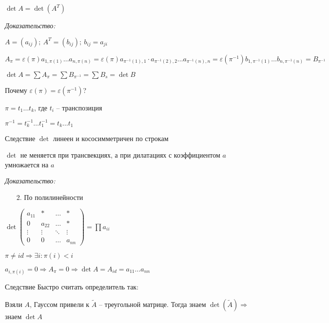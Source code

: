 \documentclass[12pt]{article}
\begin{document}
\begin{theo}{}
    $\det A = \det(A^T)$
\end{theo}

\textit{Доказательство:}

$A = (a_{ij});\ A^T = (b_{ij});\ b_{ij} = a_{ji}$

$A_\pi = \varepsilon(\pi) a_{1, \pi(1)} \ldots a_{n, \pi(n)} = \varepsilon(\pi) a_{\pi^{-1}(1), 1} \cdot a_{\pi^{-1}(2), 2} \ldots a_{\pi^{-1}(n), n} = \varepsilon(\pi^{-1}) b_{1, \pi^{-1}(1)} \ldots b_{n, \pi^{-1}(n)} = B_{\pi^{-1}}$

$\det A = \sum A_\pi = \sum B_{\pi^{-1}} = \sum B_s = \det B$

Почему $\varepsilon(\pi) = \varepsilon(\pi^{-1})$?

$\pi = t_1 \ldots t_k$, где $t_i$ -- транспозиция

$\pi^{-1} = t_k^{-1} \ldots t_1^{-1} = t_k \ldots t_1$

\begin{theo}{Следствие}
    $\det$ линеен и кососимметричен по строкам
\end{theo}

\begin{theo}{}
    $\det$ не меняется при трансвекциях, а при дилатациях с коэффициентом $a$ умножается на $a$
\end{theo}

\textit{Доказательство:}

\begin{enumerate}
    \item[2.] По полилинейности
\end{enumerate}

\begin{lem}{}
    $\det \begin{pmatrix}
        a_{11} & * & \ldots & * \\
        0 & a_{22} & \ldots & * \\
        \vdots & \vdots & \ddots & \vdots \\
        0 & 0 & \ldots & a_{nn}
    \end{pmatrix} = \prod a_{ii}$
\end{lem}

$\pi \neq id \Rightarrow \exists i : \pi(i) < i$

$a_{i, \pi(i)} = 0 \Rightarrow A_\pi = 0 \Rightarrow \det A = A_{id} = a_{11} \ldots a_{nn}$

\begin{theo}{Следствие}
    Быстро считать определитель так:

    Взяли $A$, Гауссом привели к $\tilde{A}$ -- треугольной матрице. Тогда знаем $\det(\tilde{A}) \Rightarrow$ знаем $\det A$
\end{theo}
\end{document}
